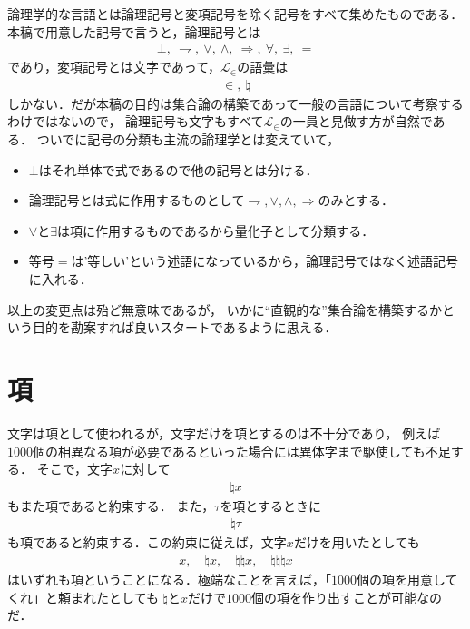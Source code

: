 	論理学的な言語とは論理記号と変項記号を除く記号をすべて集めたものである．
	本稿で用意した記号で言うと，論理記号とは
	\begin{align}
		\bot,\ \rightharpoondown,\ \vee,\ \wedge,\ \Longrightarrow,\ \forall,\ \exists,\ =
	\end{align}
	であり，変項記号とは文字であって，$\mathcal{L}_{\in}$の語彙は
	\begin{align}
		\in,\ \natural
	\end{align}
	しかない．だが本稿の目的は集合論の構築であって一般の言語について考察するわけではないので，
	論理記号も文字もすべて$\mathcal{L}_{\in}$の一員と見做す方が自然である．
	ついでに記号の分類も主流の論理学とは変えていて，
	\begin{itemize}
		\item $\bot$はそれ単体で式であるので他の記号とは分ける．
		\item 論理記号とは式に作用するものとして$\rightharpoondown,\vee,\wedge,\Longrightarrow$のみとする．
		\item $\forall$と$\exists$は項に作用するものであるから量化子として分類する．
		\item 等号$=$は'等しい'という述語になっているから，論理記号ではなく述語記号に入れる．
	\end{itemize}
	以上の変更点は殆ど無意味であるが，
	いかに``直観的な''集合論を構築するかという目的を勘案すれば良いスタートであるように思える．
	
\section{項}
	
	文字は項として使われるが，文字だけを項とするのは不十分であり，
	例えば$1000$個の相異なる項が必要であるといった場合には異体字まで駆使しても不足する．
	そこで，文字$x$に対して
	\begin{align}
		\natural x
	\end{align}
	もまた項であると約束する．
	また，$\tau$を項とするときに
	\begin{align}
		\natural \tau
	\end{align}
	も項であると約束する．この約束に従えば，文字$x$だけを用いたとしても
	\begin{align}
		x,\quad \natural x, \quad \natural \natural x, \quad \natural \natural \natural x
	\end{align}
	はいずれも項ということになる．極端なことを言えば，「$1000$個の項を用意してくれ」と頼まれたとしても
	$\natural$と$x$だけで$1000$個の項を作り出すことが可能なのだ．
	

